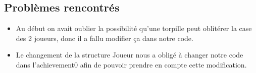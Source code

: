 \subsection{Problèmes rencontrés}
\begin{itemize}
\item Au début on avait oublier la possibilité qu'une torpille peut oblitérer la case des 2 joueurs, donc il a fallu modifier ça dans notre code.\\
\item Le changement de la structure Joueur nous a obligé à changer notre code dans l'achievement0 afin de pouvoir prendre en compte cette modification.
\end{itemize}

